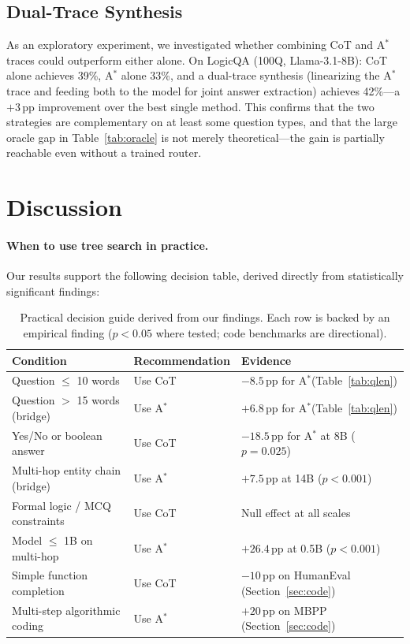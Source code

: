 \documentclass{article}
\newcommand{\astar}{A$^*$\xspace}
\begin{document}
\subsection{Dual-Trace Synthesis}
\label{sec:synthesis}

As an exploratory experiment, we investigated whether combining CoT and \astar traces could outperform either alone. On LogicQA (100Q, Llama-3.1-8B): CoT alone achieves 39\%, \astar alone 33\%, and a dual-trace synthesis (linearizing the \astar trace and feeding both to the model for joint answer extraction) achieves 42\%---a $+3$\,pp improvement over the best single method. This confirms that the two strategies are complementary on at least some question types, and that the large oracle gap in Table~\ref{tab:oracle} is not merely theoretical---the gain is partially reachable even without a trained router.

\section{Discussion}
\label{sec:discussion}

\paragraph{When to use tree search in practice.}
Our results support the following decision table, derived directly from statistically significant findings:

\begin{table}[h]
\centering
\caption{Practical decision guide derived from our findings. Each row is backed by an empirical finding ($p<0.05$ where tested; code benchmarks are directional).}
\label{tab:decision}
\small
\begin{tabular}{lll}
\toprule
Condition & Recommendation & Evidence \\
\midrule
Question $\leq$ 10 words         & Use CoT    & $-8.5$\,pp for \astar (Table~\ref{tab:qlen}) \\
Question $>$ 15 words (bridge)   & Use \astar & $+6.8$\,pp for \astar (Table~\ref{tab:qlen}) \\
Yes/No or boolean answer         & Use CoT    & $-18.5$\,pp for \astar at 8B ($p=0.025$) \\
Multi-hop entity chain (bridge)  & Use \astar & $+7.5$\,pp at 14B ($p<0.001$) \\
Formal logic / MCQ constraints   & Use CoT    & Null effect at all scales \\
Model $\leq$ 1B on multi-hop     & Use \astar & $+26.4$\,pp at 0.5B ($p<0.001$) \\
Simple function completion       & Use CoT    & $-10$\,pp on HumanEval (Section~\ref{sec:code}) \\
Multi-step algorithmic coding    & Use \astar & $+20$\,pp on MBPP (Section~\ref{sec:code}) \\
\bottomrule
\end{tabular}
\end{table}
\end{document}
